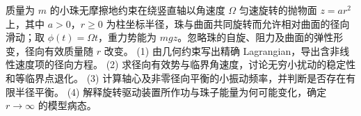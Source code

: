 质量为 \(m\) 的小珠无摩擦地约束在绕竖直轴以角速度 \(\Omega\) 匀速旋转的抛物面 \(z=ar^2\) 上，其中 \(a>0\)，\(r\ge0\) 为柱坐标半径，珠与曲面共同旋转而允许相对曲面的径向滑动；取 \(\phi(t)=\Omega t\)，重力势能为 \(mgz\)。忽略珠的自旋、阻力及曲面的弹性形变，径向有效质量随 \(r\) 改变。
(1) 由几何约束写出精确 Lagrangian，导出含非线性速度项的径向方程。
(2) 求径向有效势与临界角速度，讨论无穷小扰动的稳定性和等临界点退化。
(3) 计算轴心及非零径向平衡的小振动频率，并判断是否存在有限半径平衡。
(4) 解释旋转驱动装置所作功与珠子能量为何可能变化，确定 \(r\to\infty\) 的模型病态。
